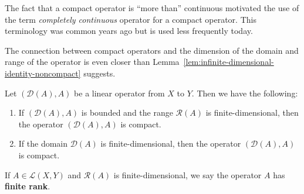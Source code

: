 The fact that a compact operator is ``more than'' continuous motivated the use of the term \emph{completely continuous} operator for a compact operator. This terminology was common years ago but is used less frequently today.

The connection between compact operators and the dimension of the domain and range of the operator is even closer than Lemma~\ref{lem:infinite-dimensional-identity-noncompact} suggests.

\begin{Theorem}
\label{thm:finite-dimensional-domain-range-compactness}
Let $(\mathcal{D}(A),A)$ be a linear operator from $X$ to $Y$. Then we have the following:\begin{enumerate}\item If $(\mathcal{D}(A),A)$ is bounded and the range $\mathcal{R}(A)$ is finite-dimensional, then the operator $(\mathcal{D}(A),A)$ is compact.\item If the domain $\mathcal{D}(A)$ is finite-dimensional, then the operator $(\mathcal{D}(A),A)$ is compact.\end{enumerate}
\end{Theorem}

\begingroup
{}
\renewcommand{\endProof}{\par\nobreak\hfill$\blacksquare$\par\vspace{0.1cm}}
\endgroup

\begin{Definition}
\label{def:finite-rank-operator}
If $A\in\mathcal{L}(X,Y)$ and $\mathcal{R}(A)$ is finite-dimensional, we say the operator $A$ has \textbf{finite rank}.
\end{Definition}

